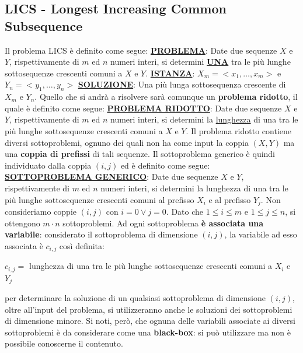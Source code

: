 \documentclass[12pt]{article}
\begin{document}
\subsection{LICS - Longest Increasing Common Subsequence}
Il problema LICS è definito come segue: \newline
\textbf{\underline{PROBLEMA}}: Date due sequenze $X$ e $Y$, rispettivamente di $m$ ed $n$ numeri interi, si determini \textbf{\underline{UNA}} tra le più lunghe sottosequenze crescenti comuni a $X$ e $Y$. \newline
\textbf{\underline{ISTANZA}}: $X_m = <x_1, \dots, x_m>$ e $Y_n = <y_1, \dots, y_n>$ \newline
\textbf{\underline{SOLUZIONE}}: Una più lunga sottosequenza crescente di $X_m$ e $Y_n$. \newline
Quello che si andrà a risolvere sarà comunque un \textbf{problema ridotto}, il quale è definito come segue: \newline
\textbf{\underline{PROBLEMA RIDOTTO}}: Date due sequenze $X$ e $Y$, rispettivamente di $m$ ed $n$ numeri interi, si determini
la \underline{lunghezza} di una tra le più lunghe sottosequenze crescenti comuni a $X$ e $Y$. \newline
Il problema ridotto contiene diversi sottoproblemi, ognuno dei quali non ha come input la coppia $(X, Y)$ ma una \textbf{coppia di prefissi} di tali sequenze.
Il sottoproblema generico è quindi individuato dalla coppia $(i,j)$ ed è definito come segue: \newline
\textbf{\underline{SOTTOPROBLEMA GENERICO}}: Date due sequenze $X$ e $Y$, rispettivamente di $m$ ed $n$ numeri interi, si determini la lunghezza di una tra le più lunghe sottosequenze crescenti comuni
al prefisso $X_i$ e al prefisso $Y_j$. \newline
Non consideriamo coppie $(i,j)$ con $i = 0 \vee j = 0$. Dato che $1 \leq i \leq m$ e $1 \leq j \leq n$, si ottengono $m \cdot n$ sottoproblemi.
Ad ogni sottoproblema \textbf{è associata una variabile}: considerato il sottoproblema di dimensione $(i,j)$, la variabile ad esso associata è $c_{i,j}$ così definita:
\begin{center}
    $c_{i,j} =$ lunghezza di una tra le più lunghe sottosequenze crescenti comuni a $X_i$ e $Y_j$
\end{center}
per determinare la soluzione di un qualsiasi sottoproblema di dimensione $(i,j)$, oltre all'input del problema, si utilizzeranno anche le soluzioni dei sottoproblemi di dimensione minore.
Si noti, però, che ognuna delle variabili associate ai diversi sottoproblemi è da considerare come una \textbf{black-box}: si può utilizzare ma non è possibile conoscerne il contenuto. \newline
\end{document}
